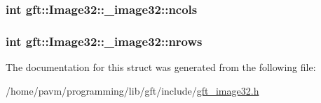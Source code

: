 \hypertarget{structgft_1_1Image32_1_1__image32_a6435c546474bb74eb8476b5683815b84}{
\subsubsection[{ncols}]{\setlength{\rightskip}{0pt plus 5cm}int gft\-::\-Image32\-::\-\_\-image32\-::ncols}}\label{structgft_1_1Image32_1_1__image32_a6435c546474bb74eb8476b5683815b84}
\hypertarget{structgft_1_1Image32_1_1__image32_aa912fd17d6133ee3d1fcf668865e4677}{
\subsubsection[{nrows}]{\setlength{\rightskip}{0pt plus 5cm}int gft\-::\-Image32\-::\-\_\-image32\-::nrows}}\label{structgft_1_1Image32_1_1__image32_aa912fd17d6133ee3d1fcf668865e4677}


The documentation for this struct was generated from the following file\-:\begin{DoxyCompactItemize}
\item 
/home/pavm/programming/lib/gft/include/\hyperlink{gft__image32_8h}{gft\-\_\-image32.\-h}\end{DoxyCompactItemize}
